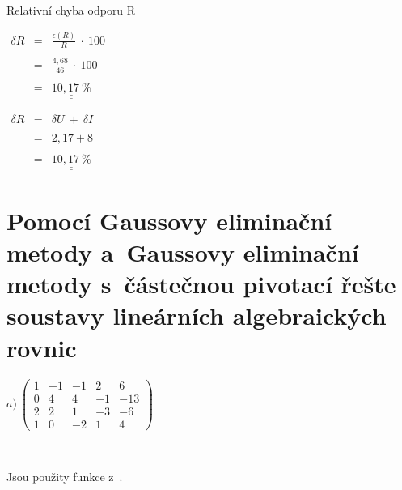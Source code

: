 \documentclass[a4paper,10pt]{article}
\def\doubleunderline#1{\underline{\underline{#1}}}
\begin{document}
\bigskip
\par{~}
\bigskip

\par Relativní chyba odporu R

\begin{minipage}[t]{.6\textwidth}

$
\begin{array}{lcl}
\delta{R} & = & \frac{\epsilon{(R)}}{R}~\cdot~100 \\
\\
          & = & \frac{4,68}{46}~\cdot~100 \\
\\
          & = & \doubleunderline{10,17~\%}
\end{array}
$

\end{minipage}%
\begin{minipage}[t]{.4\textwidth}

$
\begin{array}{lcl}
\delta{R} & = & \delta{U}~+~\delta{I} \\
\\
          & = & 2,17 + 8 \\
\\
          & = & \doubleunderline{10,17~\%}
\end{array}
$

\end{minipage}

\newpage
\section{Pomocí Gaussovy eliminační metody a~Gaussovy eliminační metody s~částečnou pivotací
řešte soustavy lineárních algebraických rovnic}

$
a)~
\left( \begin{array}{rrrr|r}
1 & -1 & -1 &  2 &   6 \\
0 &  4 &  4 & -1 & -13 \\
2 &  2 &  1 & -3 &  -6 \\
1 &  0 & -2 &  1 &   4 
\end{array} \right)
$

\par {~}


\par Jsou použity funkce z~. \\


\end{document}
